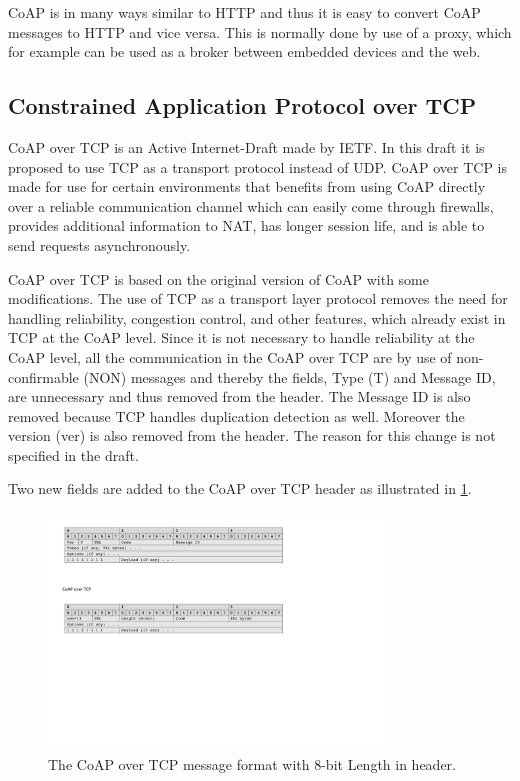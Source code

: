 CoAP is in many ways similar to HTTP and thus it is easy to convert CoAP messages to HTTP and vice versa. This is normally done by use of a proxy, which for example can be used as a broker between embedded devices and the web. 




\subsection{Constrained Application Protocol over TCP}
CoAP over TCP is an Active Internet-Draft made by IETF. 
In this draft it is proposed to use TCP as a transport protocol instead of UDP.
CoAP over TCP is made for use for certain environments that benefits from using CoAP directly over a reliable communication channel which can easily come through firewalls, provides additional information to NAT, has longer session life, and is able to send requests asynchronously. 

CoAP over TCP is based on the original version of CoAP with some modifications. 
The use of TCP as a transport layer protocol removes the need for handling reliability, congestion control, and other features, which already exist in TCP at the CoAP level.
Since it is not necessary to handle reliability at the CoAP level, all the communication in the CoAP over TCP are by use of non-confirmable (NON) messages and thereby the fields, Type (T) and Message ID, are unnecessary and thus removed from the header. 
The Message ID is also removed because TCP handles duplication detection as well.
Moreover the version (ver) is also removed from the header. The reason for this change is not specified in the draft.

Two new fields are added to the CoAP over TCP header as illustrated in \figurename{\ref{fig:msgformatcoapovertcp}}.
\begin{figure}[bht]
	\centering
	\includegraphics[width=3.5in]{gfx/msgformat-coapovertcp}
	\caption{The CoAP over TCP message format with 8-bit Length in header.}
	\label{fig:msgformatcoapovertcp}
\end{figure}

